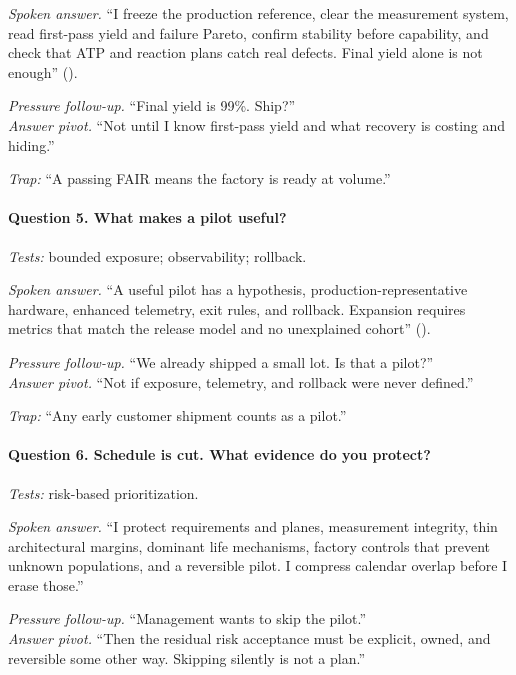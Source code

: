 \textit{Spoken answer.}
``I freeze the production reference, clear the measurement system, read
first-pass yield and failure Pareto, confirm stability before capability, and
check that ATP and reaction plans catch real defects. Final yield alone is not
enough'' ().

\textit{Pressure follow-up.} ``Final yield is 99\%. Ship?''\\
\textit{Answer pivot.} ``Not until I know first-pass yield and what recovery is
costing and hiding.''

\textit{Trap:} ``A passing FAIR means the factory is ready at volume.''

\paragraph{Question 5. What makes a pilot useful?}
\textit{Tests:} bounded exposure; observability; rollback.

\textit{Spoken answer.}
``A useful pilot has a hypothesis, production-representative hardware,
enhanced telemetry, exit rules, and rollback. Expansion requires metrics that
match the release model and no unexplained cohort''
().

\textit{Pressure follow-up.} ``We already shipped a small lot. Is that a
pilot?''\\
\textit{Answer pivot.} ``Not if exposure, telemetry, and rollback were never
defined.''

\textit{Trap:} ``Any early customer shipment counts as a pilot.''

\paragraph{Question 6. Schedule is cut. What evidence do you protect?}
\textit{Tests:} risk-based prioritization.

\textit{Spoken answer.}
``I protect requirements and planes, measurement integrity, thin architectural
margins, dominant life mechanisms, factory controls that prevent unknown
populations, and a reversible pilot. I compress calendar overlap before I erase
those.''

\textit{Pressure follow-up.} ``Management wants to skip the pilot.''\\
\textit{Answer pivot.} ``Then the residual risk acceptance must be explicit,
owned, and reversible some other way. Skipping silently is not a plan.''

